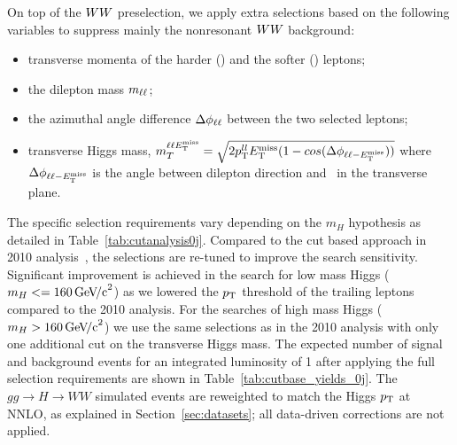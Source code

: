 On top of the $WW$ preselection, we apply extra selections based on the following variables to 
suppress mainly the nonresonant $WW$ background:
\begin{itemize}
\item transverse momenta of the harder (\ptlmax ) 
and the softer (\ptlmin) leptons;
\item the dilepton mass $m_{\ell\ell}$;
\item the azimuthal angle difference $\Delta\phi_{\ell\ell}$ between the two selected leptons;
\item transverse Higgs mass, 
$m_{T}^{\ell\ell E_\mathrm{T}^{\mathrm{miss}}} = \sqrt{2p_\mathrm{T}^{ll}E_\mathrm{T}^{\mathrm{miss}}(1-cos(\Delta\phi_{\ell\ell-E_\mathrm{T}^{\mathrm{miss}}}))}$ where 
$\Delta\phi_{\ell\ell-E_\mathrm{T}^{\mathrm{miss}}}$ is the angle between dilepton
direction and \met\ in the transverse plane.
\end{itemize}

The specific selection requirements vary depending on the $m_H$ hypothesis as detailed in 
Table~\ref{tab:cutanalysis0j}. 
Compared to the cut based approach in 2010 analysis~\cite{HWW2010}, the selections 
are re-tuned to improve the search sensitivity. 
Significant improvement is achieved in the search for low mass Higgs ($m_H<=160\,\mathrm{Ge\kern -0.1em V\!/c}^2$) 
as we lowered the $p_\mathrm{T}$ threshold of the trailing leptons compared to the 2010 analysis. 
For the searches of high mass Higgs ($m_H > 160 \,\mathrm{Ge\kern -0.1em V\!/c}^2$) we use the same 
selections as in the 2010 analysis with only one additional cut on the transverse Higgs mass. 
The expected number 
of signal and background events for an integrated luminosity of 1\ifb{} after 
applying the full selection requirements are shown in 
Table~\ref{tab:cutbase_yields_0j}. The $gg \to H \to WW$ 
simulated events are reweighted to match the Higgs $p_\mathrm{T}$ at NNLO, as explained 
in Section~\ref{sec:datasets}; all data-driven corrections are not applied.

